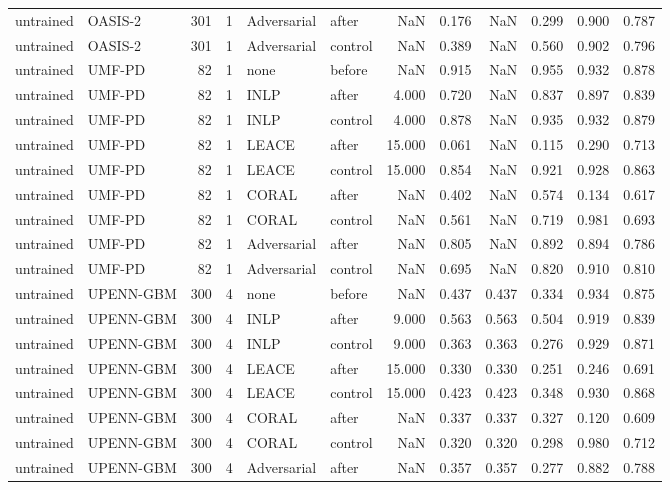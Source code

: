 \begin{tabular}{llrrllrrrrrr}
untrained & OASIS-2 & 301 & 1 & Adversarial & after & NaN & 0.176 & NaN & 0.299 & 0.900 & 0.787 \\
untrained & OASIS-2 & 301 & 1 & Adversarial & control & NaN & 0.389 & NaN & 0.560 & 0.902 & 0.796 \\
untrained & UMF-PD & 82 & 1 & none & before & NaN & 0.915 & NaN & 0.955 & 0.932 & 0.878 \\
untrained & UMF-PD & 82 & 1 & INLP & after & 4.000 & 0.720 & NaN & 0.837 & 0.897 & 0.839 \\
untrained & UMF-PD & 82 & 1 & INLP & control & 4.000 & 0.878 & NaN & 0.935 & 0.932 & 0.879 \\
untrained & UMF-PD & 82 & 1 & LEACE & after & 15.000 & 0.061 & NaN & 0.115 & 0.290 & 0.713 \\
untrained & UMF-PD & 82 & 1 & LEACE & control & 15.000 & 0.854 & NaN & 0.921 & 0.928 & 0.863 \\
untrained & UMF-PD & 82 & 1 & CORAL & after & NaN & 0.402 & NaN & 0.574 & 0.134 & 0.617 \\
untrained & UMF-PD & 82 & 1 & CORAL & control & NaN & 0.561 & NaN & 0.719 & 0.981 & 0.693 \\
untrained & UMF-PD & 82 & 1 & Adversarial & after & NaN & 0.805 & NaN & 0.892 & 0.894 & 0.786 \\
untrained & UMF-PD & 82 & 1 & Adversarial & control & NaN & 0.695 & NaN & 0.820 & 0.910 & 0.810 \\
untrained & UPENN-GBM & 300 & 4 & none & before & NaN & 0.437 & 0.437 & 0.334 & 0.934 & 0.875 \\
untrained & UPENN-GBM & 300 & 4 & INLP & after & 9.000 & 0.563 & 0.563 & 0.504 & 0.919 & 0.839 \\
untrained & UPENN-GBM & 300 & 4 & INLP & control & 9.000 & 0.363 & 0.363 & 0.276 & 0.929 & 0.871 \\
untrained & UPENN-GBM & 300 & 4 & LEACE & after & 15.000 & 0.330 & 0.330 & 0.251 & 0.246 & 0.691 \\
untrained & UPENN-GBM & 300 & 4 & LEACE & control & 15.000 & 0.423 & 0.423 & 0.348 & 0.930 & 0.868 \\
untrained & UPENN-GBM & 300 & 4 & CORAL & after & NaN & 0.337 & 0.337 & 0.327 & 0.120 & 0.609 \\
untrained & UPENN-GBM & 300 & 4 & CORAL & control & NaN & 0.320 & 0.320 & 0.298 & 0.980 & 0.712 \\
untrained & UPENN-GBM & 300 & 4 & Adversarial & after & NaN & 0.357 & 0.357 & 0.277 & 0.882 & 0.788 \\

\end{tabular}
